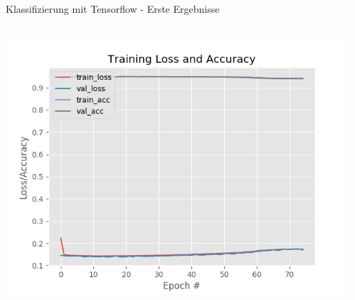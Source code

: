\documentclass[10pt,%
	wide,%
	xcolor={x11names},%
	hyperref={colorlinks},%
	pantone312,%
	handout,%
	]{beamer}
\begin{document}
\begin{frame}[t]{Klassifizierung mit Tensorflow - Erste Ergebnisse}
	\begin{columns}
		\begin{column}[t]{6cm}
			\begin{center}
			\includegraphics[width=1\textwidth]{img/keras_training_loss.png}
			\end{center}
		\end{column}
		\begin{column}[t]{6cm}

		\end{column}		
	\end{columns}
\end{frame}
\end{document}
